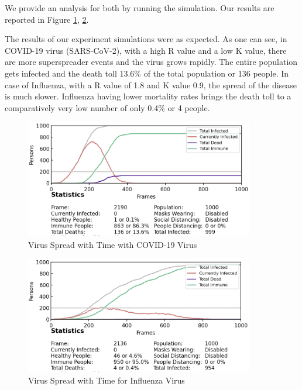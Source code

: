 \documentclass[11pt]{article}
\begin{document}
We provide an analysis for both by running the simulation. Our results are reported in Figure \ref{covid-analysis}, \ref{influenza-analysis}. 

The results of our experiment simulations were as expected. As one can see, in COVID-19 virus (SARS-CoV-2), with a high R value and a low K value, there are more superspreader events and the virus grows rapidly. The entire population gets infected and the death toll 13.6\% of the total population or 136 people. In case of Influenza, with a R value of 1.8 and K value 0.9, the spread of the disease is much slower. Influenza having lower mortality rates brings the death toll to a comparatively very low number of only 0.4\% or 4 people.

\begin{figure}[H]
    \centering
    \includegraphics[width=10cm]{figures/covid-analysis.png}
    \caption{Virus Spread with Time with COVID-19 Virus}
    \label{covid-analysis}
\end{figure}

\begin{figure}[H]
    \centering
    \includegraphics[width=10cm]{figures/influenza-analysis.png}
    \caption{Virus Spread with Time for Influenza Virus}
    \label{influenza-analysis}
\end{figure}
\end{document}
